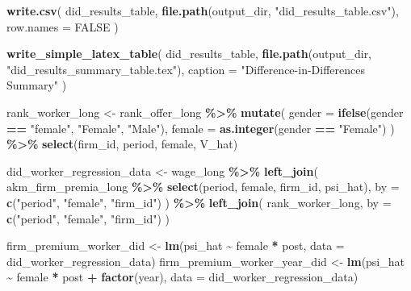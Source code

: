 \documentclass[
]{article}
\newenvironment{Shaded}{\begin{snugshade}}{\end{snugshade}}
\newcommand{\AttributeTok}[1]{\textcolor[rgb]{0.13,0.29,0.53}{#1}}
\newcommand{\ConstantTok}[1]{\textcolor[rgb]{0.56,0.35,0.01}{#1}}
\newcommand{\FunctionTok}[1]{\textcolor[rgb]{0.13,0.29,0.53}{\textbf{#1}}}
\newcommand{\NormalTok}[1]{#1}
\newcommand{\OtherTok}[1]{\textcolor[rgb]{0.56,0.35,0.01}{#1}}
\newcommand{\SpecialCharTok}[1]{\textcolor[rgb]{0.81,0.36,0.00}{\textbf{#1}}}
\newcommand{\StringTok}[1]{\textcolor[rgb]{0.31,0.60,0.02}{#1}}
\begin{document}
\begin{Shaded}
\begin{Highlighting}[]
\FunctionTok{write.csv}\NormalTok{(}
\NormalTok{    did\_results\_table,}
    \FunctionTok{file.path}\NormalTok{(output\_dir, }\StringTok{"did\_results\_table.csv"}\NormalTok{),}
    \AttributeTok{row.names =} \ConstantTok{FALSE}
\NormalTok{)}

\FunctionTok{write\_simple\_latex\_table}\NormalTok{(}
\NormalTok{    did\_results\_table,}
    \FunctionTok{file.path}\NormalTok{(output\_dir, }\StringTok{"did\_results\_summary\_table.tex"}\NormalTok{),}
    \AttributeTok{caption =} \StringTok{"Difference{-}in{-}Differences Summary"}
\NormalTok{)}

\NormalTok{rank\_worker\_long }\OtherTok{\textless{}{-}}\NormalTok{ rank\_offer\_long }\SpecialCharTok{\%\textgreater{}\%}
    \FunctionTok{mutate}\NormalTok{(}
        \AttributeTok{gender =} \FunctionTok{ifelse}\NormalTok{(gender }\SpecialCharTok{==} \StringTok{"female"}\NormalTok{, }\StringTok{"Female"}\NormalTok{, }\StringTok{"Male"}\NormalTok{),}
        \AttributeTok{female =} \FunctionTok{as.integer}\NormalTok{(gender }\SpecialCharTok{==} \StringTok{"Female"}\NormalTok{)}
\NormalTok{    ) }\SpecialCharTok{\%\textgreater{}\%}
    \FunctionTok{select}\NormalTok{(firm\_id, period, female, V\_hat)}

\NormalTok{did\_worker\_regression\_data }\OtherTok{\textless{}{-}}\NormalTok{ wage\_long }\SpecialCharTok{\%\textgreater{}\%}
    \FunctionTok{left\_join}\NormalTok{(}
\NormalTok{        akm\_firm\_premia\_long }\SpecialCharTok{\%\textgreater{}\%} \FunctionTok{select}\NormalTok{(period, female, firm\_id, psi\_hat),}
        \AttributeTok{by =} \FunctionTok{c}\NormalTok{(}\StringTok{"period"}\NormalTok{, }\StringTok{"female"}\NormalTok{, }\StringTok{"firm\_id"}\NormalTok{)}
\NormalTok{    ) }\SpecialCharTok{\%\textgreater{}\%}
    \FunctionTok{left\_join}\NormalTok{(}
\NormalTok{        rank\_worker\_long,}
        \AttributeTok{by =} \FunctionTok{c}\NormalTok{(}\StringTok{"period"}\NormalTok{, }\StringTok{"female"}\NormalTok{, }\StringTok{"firm\_id"}\NormalTok{)}
\NormalTok{    )}

\NormalTok{firm\_premium\_worker\_did }\OtherTok{\textless{}{-}} \FunctionTok{lm}\NormalTok{(psi\_hat }\SpecialCharTok{\textasciitilde{}}\NormalTok{ female }\SpecialCharTok{*}\NormalTok{ post, }\AttributeTok{data =}\NormalTok{ did\_worker\_regression\_data)}
\NormalTok{firm\_premium\_worker\_year\_did }\OtherTok{\textless{}{-}} \FunctionTok{lm}\NormalTok{(psi\_hat }\SpecialCharTok{\textasciitilde{}}\NormalTok{ female }\SpecialCharTok{*}\NormalTok{ post }\SpecialCharTok{+} \FunctionTok{factor}\NormalTok{(year), }\AttributeTok{data =}\NormalTok{ did\_worker\_regression\_data)}


\end{Highlighting}
\end{Shaded}
\end{document}
